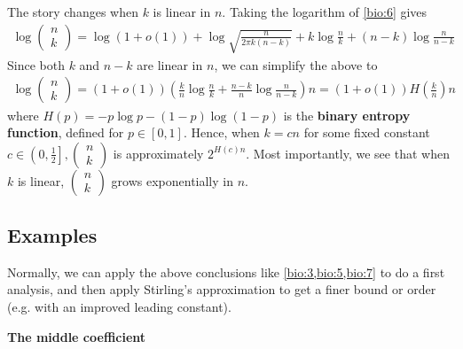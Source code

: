 \documentclass{article}
\begin{document}
\begin{enumerate}
The story changes when $k$ is linear in $n$. Taking the logarithm of \cref{bio:6} gives
\begin{align*}
\log \left(\begin{array}{l}
n \\
k
\end{array}\right)=\log (1+o(1))+\log \sqrt{\frac{n}{2 \pi k(n-k)}}+k \log \frac{n}{k}+(n-k) \log \frac{n}{n-k}
\end{align*}
Since both $k$ and $n-k$ are linear in $n$, we can simplify the above to
\begin{align}
\log \left(\begin{array}{l}
n \\
k
\end{array}\right)=(1+o(1))\left(\frac{k}{n} \log \frac{n}{k}+\frac{n-k}{n} \log \frac{n}{n-k}\right) n=(1+o(1)) H\left(\frac{k}{n}\right) n \label{bio:7}
\end{align}
where $H(p)=-p \log p-(1-p) \log (1-p)$ is the \textbf{binary entropy function}, defined for $p \in[0,1] .$ Hence, when $k=c n$ for some fixed constant $c \in\left(0, \frac{1}{2}\right],\left(\begin{array}{c}n \\ k\end{array}\right)$ is approximately $2^{H(c) n}$. Most importantly, we see that when $k$ is linear, $\left(\begin{array}{c}n \\ k\end{array}\right)$ grows exponentially in $n$.
\end{enumerate}

\subsection{Examples}
Normally, we can apply the above conclusions like \cref{bio:3,bio:5,bio:7} to do a first analysis, and then apply Stirling's approximation to get a finer bound or order (e.g. with an improved leading constant).

\textbf{The middle coefficient}
\end{document}
